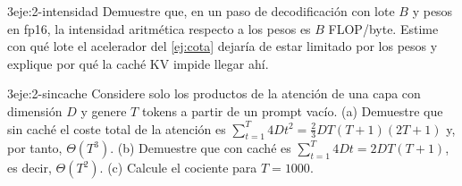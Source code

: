 \begin{ejercicio}{3}{eje:2-intensidad}
Demuestre que, en un paso de decodificación con lote $B$ y pesos en fp16, la intensidad aritmética respecto a los pesos es $B$ FLOP/byte. Estime con qué lote el acelerador del \cref{ej:cota} dejaría de estar limitado por los pesos y explique por qué la caché KV impide llegar ahí.
\end{ejercicio}

\begin{ejercicio}{3}{eje:2-sincache}
Considere solo los productos de la atención de una capa con dimensión $D$ y genere $T$ tokens a partir de un prompt vacío. (a) Demuestre que sin caché el coste total de la atención es $\sum_{t=1}^{T}4Dt^{2}=\tfrac{2}{3}DT(T+1)(2T+1)$ y, por tanto, $\Theta(T^{3})$. (b) Demuestre que con caché es $\sum_{t=1}^{T}4Dt=2DT(T+1)$, es decir, $\Theta(T^{2})$. (c) Calcule el cociente para $T=1000$.
\end{ejercicio}
